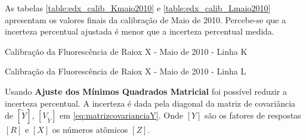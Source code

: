 
 
As tabelas \ref{table:edx_calib_Kmaio2010} e \ref{table:edx_calib_Lmaio2010}
apresentam os valores finais da calibração de Maio de 2010. 
Percebe-se que a incerteza percentual ajustada é menor que 
a incerteza percentual medida. 

\begin{table}[H]
  \centering
  \begin{scriptsize} 
    
  \end{scriptsize}
  \caption{Calibração da Fluorescência de Raiox X - Maio de 2010 - Linha K
  \label{table:edx_calib_Kmaio2010}}
\end{table}

\begin{table}[H]
  \centering
  \begin{scriptsize} 
    
  \end{scriptsize}
  \caption{Calibração da Fluorescência de Raiox X - Maio de 2010 - Linha L 
  \label{table:edx_calib_Lmaio2010}}
\end{table}

Usando \textbf{Ajuste dos Mínimos Quadrados Matricial} foi possível
reduzir a incerteza percentual. 
A incerteza é dada pela diagonal da matriz de covariância 
de $[\tilde{Y}]$, $[V_{\tilde{Y}}]$ em \ref{eq:matrizcovarianciaY}.
Onde $[Y]$ são os fatores de respostas $[R]$ e $[X]$ os números atômicos $[Z]$.

